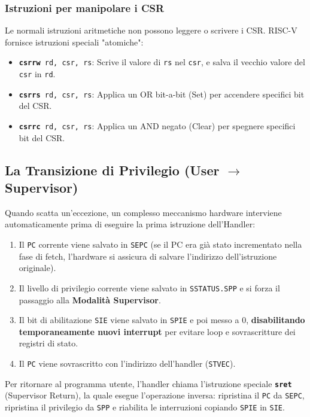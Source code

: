\documentclass[12pt, a4paper]{article}
\begin{document}
\subsubsection{Istruzioni per manipolare i CSR}
Le normali istruzioni aritmetiche non possono leggere o scrivere i CSR. RISC-V fornisce istruzioni speciali "atomiche":
\begin{itemize}
    \item \texttt{\textbf{csrrw} rd, csr, rs}: Scrive il valore di \texttt{rs} nel \texttt{csr}, e salva il vecchio valore del \texttt{csr} in \texttt{rd}.
    \item \texttt{\textbf{csrrs} rd, csr, rs}: Applica un OR bit-a-bit (Set) per accendere specifici bit del CSR.
    \item \texttt{\textbf{csrrc} rd, csr, rs}: Applica un AND negato (Clear) per spegnere specifici bit del CSR.
\end{itemize}

\newpage

\subsection{La Transizione di Privilegio (User \texorpdfstring{$\rightarrow$}{→} Supervisor)}
Quando scatta un'eccezione, un complesso meccanismo hardware interviene automaticamente prima di eseguire la prima istruzione dell'Handler:
\begin{enumerate}
    \item Il \texttt{PC} corrente viene salvato in \texttt{SEPC} (se il PC era già stato incrementato nella fase di fetch, l'hardware si assicura di salvare l'indirizzo dell'istruzione originale).
    \item Il livello di privilegio corrente viene salvato in \texttt{SSTATUS.SPP} e si forza il passaggio alla \textbf{Modalità Supervisor}.
    \item Il bit di abilitazione \texttt{SIE} viene salvato in \texttt{SPIE} e poi messo a 0, \textbf{disabilitando temporaneamente nuovi interrupt} per evitare loop e sovrascritture dei registri di stato.
    \item Il \texttt{PC} viene sovrascritto con l'indirizzo dell'handler (\texttt{STVEC}).
\end{enumerate}
Per ritornare al programma utente, l'handler chiama l'istruzione speciale \texttt{\textbf{sret}} (Supervisor Return), la quale esegue l'operazione inversa: ripristina il \texttt{PC} da \texttt{SEPC}, ripristina il privilegio da \texttt{SPP} e riabilita le interruzioni copiando \texttt{SPIE} in \texttt{SIE}.
\end{document}
